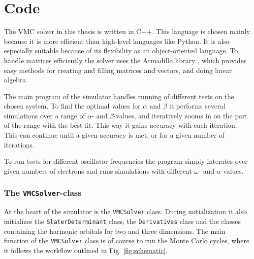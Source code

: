 \section{Code}
	
	The VMC solver in this thesis is written in C++. This language is chosen mainly because it is more efficient than high-level languages like Python. It is also especially suitable because of its flexibility as an object-oriented language. To handle matrices efficiently the solver uses the Armadillo library \cite{sanderson2010armadillo}, which provides easy methods for creating and filling matrices and vectors, and doing linear algebra. 

	The main program of the simulator handles running of different tests on the chosen system. To find the optimal values for $\alpha$ and $\beta$ it performs  several simulations over a range of $\alpha$- and $\beta$-values, and iteratively zooms in on the part of the range with the best fit. This way it gains accuracy with each iteration. This can continue until a given accuracy is met, or for a given number of iterations.

	To run tests for different oscillator frequencies the program simply interates over given numbers of electrons and runs simulations with different $\omega$- and $\alpha$-values. 

	\subsubsection{The {\tt VMCSolver}-class}
		At the heart of the simulator is the {\tt VMCSolver} class. During initialization it also initializes the {\tt SlaterDeterminant} class, the {\tt Derivatives} class and the classes containing the harmonic orbitals for two and three dimensions. The main function of the {\tt VMCSolver} class is of course to run the Monte Carlo cycles, where it follows the workflow outlined in Fig. \ref{fig:schematic}.

